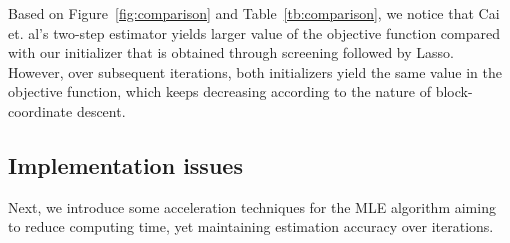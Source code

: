 Based on Figure~\ref{fig:comparison} and Table~\ref{tb:comparison}, we notice that Cai et. al's two-step estimator yields larger value of the objective function compared with our initializer that is obtained through screening followed by Lasso. However, over subsequent iterations, both initializers yield the same value in the objective function, which keeps decreasing according to the nature of block-coordinate descent.  

\subsection{\normalsize Implementation issues}

Next, we introduce some acceleration techniques for the MLE algorithm aiming to reduce  computing time, yet maintaining estimation accuracy over iterations.

